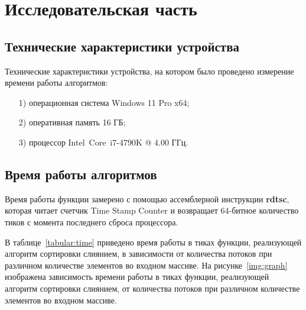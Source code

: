 \chapter{Исследовательская часть}

\section{Технические характеристики устройства}

Технические характеристики устройства, на котором было проведено измерение времени работы алгоритмов:

\begin{enumerate}
\item[1)]
операционная система Windows 11 Pro x64;
\item[2)]
оперативная память 16 ГБ;
\item[3)]
процессор Intel\textregistered ~Core\texttrademark ~i7-4790K @ 4.00 ГГц.
\end{enumerate}

\section{Время работы алгоритмов}

Время работы функции замерено с помощью ассемблерной инструкции \textbf{rdtsc}, которая читает счетчик Time Stamp Counter и возвращает 64-битное количество тиков с момента последнего сброса процессора.

В таблице~\ref{tabular:time} приведено время работы в тиках функции, реализующей алгоритм сортировки слиянием, в зависимости от количества потоков при различном количестве элементов во входном массиве.
На рисунке~\ref{img:graph} изображена зависимость времени работы в тиках функции, реализующей алгоритм сортировки слиянием, от количества потоков при различном количестве элементов во входном массиве.

